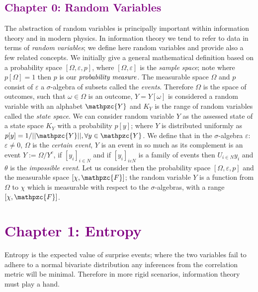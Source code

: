 \documentclass[7pt]{article}
\begin{document}
\subsection*{\textcolor{purple}{Chapter 0: Random Variables}}
The abstraction of {random variables} is principally important within information theory and in modern physics. In information theory we tend to refer to data in terms of \emph{random variables};  we define here  {random variables} and provide also a few related concepts. We initially give a general mathematical definition based on a probability space $[ \Omega, \varepsilon, p ]$, where $[ \Omega, \varepsilon ]$ is the \emph{sample space}; note where $p[\Omega] = 1$ then $p$ is our $\emph{probability measure}$. The measurable space $\Omega$ and $p$ consist of $\varepsilon$  a $\sigma$-algebra of subsets called the \emph{events}. Therefore $\Omega$ is the space of outcomes, such that $\omega \in \Omega$ is an outcome, $Y = Y[\omega]$ is considered a random variable with an alphabet $\mathpzc{Y}$ and $K_Y$ is the range of random variables called the \emph{state space}.   We can consider random variable $Y$ as the assessed state of a state space $K_Y$ with a probability $p[y]$; where $Y$ is distributed uniformly as $p[y] = 1/||\mathpzc{Y}||,\forall y \in  \mathpzc{Y}$. We define that in the $\sigma$-algebra $\varepsilon$: $\varepsilon \neq 0$, $\Omega$ is the \emph{certain event}, $Y$ is an event in so much as its complement is an event $Y := \Omega / Y^{c}$, if $[y_i]_{i \in N}$ and if $[y_i]_{i \varepsilon N}$ is a family of events then $U_{i\in N} y_i$ and $\theta$ is the \emph{impossible event}.   Let us consider then the probability space $[\Omega, \varepsilon, p]$  and the measurable space $[\chi, \mathpzc{F}]$; the random variable $Y$ is a function from $\Omega$ to $\chi$ which is measurable with respect to the $\sigma$-algebras, with a range $[\chi,\mathpzc{F}]$.


\section*{\textcolor{purple}{Chapter 1: Entropy}}
Entropy  is the expected value of surprise events; where the two variables fail to adhere to a normal bivariate distribution any inferences from the correlation metric will be minimal. Therefore in more rigid scenarios, information theory must play a hand.
\end{document}
